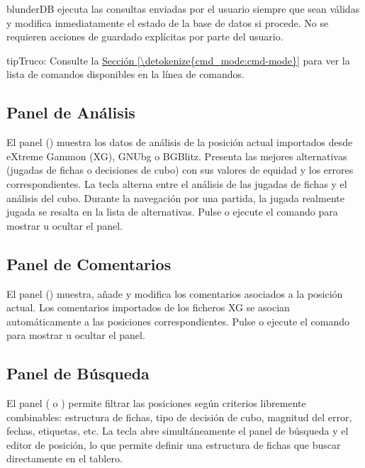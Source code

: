 \documentclass[letterpaper,10pt,spanish]{sphinxmanual}
\begin{document}
\sphinxAtStartPar
blunderDB ejecuta las consultas enviadas por el usuario siempre que sean válidas y modifica inmediatamente el estado de la base de datos si procede. No se requieren acciones de guardado explícitas por parte del usuario.

\begin{sphinxadmonition}{tip}{Truco:}
\sphinxAtStartPar
Consulte la \hyperref[\detokenize{cmd_mode:cmd-mode}]{Sección \ref{\detokenize{cmd_mode:cmd-mode}}} para ver la lista de comandos disponibles en la línea de comandos.
\end{sphinxadmonition}


\subsection{Panel de Análisis}
\label{\detokenize{manuel:panneau-analyse}}\label{\detokenize{manuel:id3}}
\sphinxAtStartPar
El panel  () muestra los datos de análisis de la posición actual importados desde eXtreme Gammon (XG), GNUbg o BGBlitz. Presenta las mejores alternativas (jugadas de fichas o decisiones de cubo) con sus valores de equidad y los errores correspondientes. La tecla  alterna entre el análisis de las jugadas de fichas y el análisis del cubo. Durante la navegación por una partida, la jugada realmente jugada se resalta en la lista de alternativas. Pulse  o ejecute el comando  para mostrar u ocultar el panel.


\subsection{Panel de Comentarios}
\label{\detokenize{manuel:panneau-commentaires}}\label{\detokenize{manuel:id4}}
\sphinxAtStartPar
El panel  () muestra, añade y modifica los comentarios asociados a la posición actual. Los comentarios importados de los ficheros XG se asocian automáticamente a las posiciones correspondientes. Pulse  o ejecute el comando  para mostrar u ocultar el panel.


\subsection{Panel de Búsqueda}
\label{\detokenize{manuel:panneau-recherche}}\label{\detokenize{manuel:id5}}
\sphinxAtStartPar
El panel  ( o ) permite filtrar las posiciones según criterios libremente combinables: estructura de fichas, tipo de decisión de cubo, magnitud del error, fechas, etiquetas, etc. La tecla  abre simultáneamente el panel de búsqueda y el editor de posición, lo que permite definir una estructura de fichas que buscar directamente en el tablero.
\end{document}
